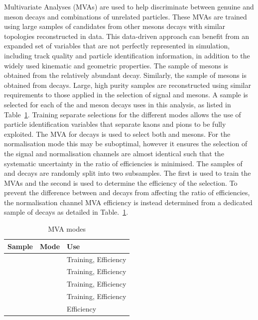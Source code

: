 Multivariate Analyses (MVAs) are used to help discriminate between genuine \Dsp and \phiz meson decays and combinations of unrelated particles. 
These MVAs are trained using large samples of candidates from other \B mesons decays with similar topologies reconstructed in data. 
This data-driven approach can benefit from an expanded set of variables that are not perfectly represented in simulation, including track quality and particle identification information, in addition to the widely used kinematic and geometric properties.
The sample of \Dsp mesons is obtained from the relatively abundant \decay{\Bsb}{\Dsp\pim} decay. Similarly, the sample of \phiz mesons is obtained from \decay{\Bs}{\jpsi\phiz} decays. Large, high purity samples are reconstructed using similar requirements to those applied in the selection of signal \Dsp and \phiz mesons.
A sample is selected for each of the \Dsp and \phiz meson decays uses in this analysis, as listed in Table~\ref{tab:mva_modes}. 
Training separate selections for the different \Dsp modes allows the use of particle identification variables that separate kaons and pions to be fully exploited.
The MVA for \decay{\phiz}{\Kp\Km} decays is used to select both \phiz and \Dzb mesons. For the normalisation mode this may be suboptimal, however it ensures the selection of the signal and normalisation channels are almost identical such that the systematic uncertainty in the ratio of efficiencies is minimised.
The samples of \decay{\Bsb}{\Dsp\pim} and \decay{\Bs}{\jpsi\phiz} decays are randomly split into two subsamples. The first is used to train the MVAs and the second is used to determine the efficiency of the selection. To prevent the difference between \phiz and \Dzb decays from affecting the ratio of efficiencies, the normalisation channel MVA efficiency is instead determined from a dedicated sample of \decay{\Dzb}{\Kp\Km} decays as detailed in Table.~\ref{tab:mva_modes}.

\begin{table}[t]
 \caption{MVA modes}
\begin{center}\begin{tabular}{lll}
   \hline
   Sample                    & Mode                       & Use \\ 
   \hline
   \decay{\Bsb}{\Dsp\pim}    & \decay{\Dsp}{\Kp\Km\pip}   & Training, Efficiency \\
   \decay{\Bsb}{\Dsp\pim}    & \decay{\Dsp}{\Kp\pim\pip}  & Training, Efficiency \\
   \decay{\Bsb}{\Dsp\pim}    & \decay{\Dsp}{\pip\pim\pip} & Training, Efficiency \\
   \decay{\Bs}{\jpsi\phiz}   & \decay{\phiz}{\Kp\Km}      & Training, Efficiency \\
   \hline
   \decay{\Bp}{\Dzb\pip}     & \decay{\Dzb}{\Kp\Km}       & Efficiency          \\
   \hline
 \end{tabular}\end{center}
\label{tab:mva_modes}
\end{table}


